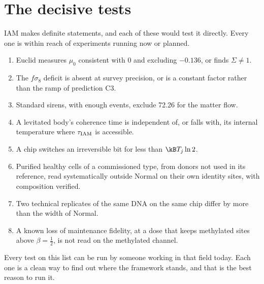 \section{The decisive tests}
IAM makes definite statements, and each of these would test it directly. Every one is within reach of experiments running now or planned.
\begin{enumerate}
\item Euclid measures $\mu_0$ consistent with 0 and excluding $-0.136$, or finds $\Sigma\ne1$.
\item The $f\sigma_8$ deficit is absent at survey precision, or is a constant factor rather than the ramp of prediction C3.
\item Standard sirens, with enough events, exclude 72.26 for the matter flow.
\item A levitated body's coherence time is independent of, or falls with, its internal temperature where $\tau_{\rm IAM}$ is accessible.
\item A chip switches an irreversible bit for less than $\kB T_j\ln2$.
\item Purified healthy cells of a commissioned type, from donors not used in its reference, read systematically outside Normal on their own
      identity sites, with composition verified.
\item Two technical replicates of the same DNA on the same chip differ by more than the width of Normal.
\item A known loss of maintenance fidelity, at a dose that keeps methylated sites above $\beta=\tfrac12$, is not read on the methylated channel.
\end{enumerate}

Every test on this list can be run by someone working in that field today. Each one is a clean way to find out where the framework stands, and that is the best reason to run it.
